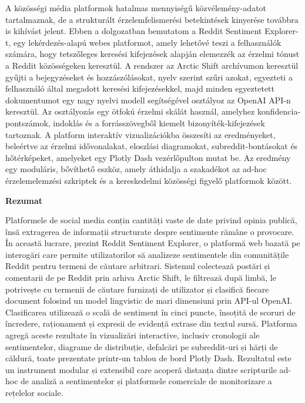 \begin{sloppypar}
A közösségi média platformok hatalmas mennyiségű közvélemény-adatot tartalmaznak, de a strukturált érzelemfelismerési betekintések kinyerése továbbra is kihívást jelent. Ebben a dolgozatban bemutatom a Reddit Sentiment Explorer-t, egy lekérdezés-alapú webes platformot, amely lehetővé teszi a felhasználók számára, hogy tetszőleges keresési kifejezések alapján elemezzék az érzelmi tónust a Reddit közösségeken keresztül. A rendszer az Arctic Shift archívumon keresztül gyűjti a bejegyzéseket és hozzászólásokat, nyelv szerint szűri azokat, egyezteti a felhasználó által megadott keresési kifejezésekkel, majd minden egyeztetett dokumentumot egy nagy nyelvi modell segítségével osztályoz az OpenAI API-n keresztül. Az osztályozás egy ötfokú érzelmi skálát használ, amelyhez konfidencia-pontszámok, indoklás és a forrásszövegből kiemelt bizonyíték-kifejezések tartoznak. A platform interaktív vizualizációkba összesíti az eredményeket, beleértve az érzelmi idővonalakat, eloszlási diagramokat, subreddit-bontásokat és hőtérképeket, amelyeket egy Plotly Dash vezérlőpulton mutat be. Az eredmény egy moduláris, bővíthető eszköz, amely áthidalja a szakadékot az ad-hoc érzelemelemzési szkriptek és a kereskedelmi közösségi figyelő platformok között.
\end{sloppypar}

\vspace{2em}

\begin{center}
  {\fontsize{14}{16} \textbf{Rezumat}}
\end{center}

Platformele de social media conțin cantități vaste de date privind opinia publică, însă extragerea de informații structurate despre sentimente rămâne o provocare. În această lucrare, prezint Reddit Sentiment Explorer, o platformă web bazată pe interogări care permite utilizatorilor să analizeze sentimentele din comunitățile Reddit pentru termeni de căutare arbitrari. Sistemul colectează postări și comentarii de pe Reddit prin arhiva Arctic Shift, le filtrează după limbă, le potrivește cu termenii de căutare furnizați de utilizator și clasifică fiecare document folosind un model lingvistic de mari dimensiuni prin API-ul OpenAI. Clasificarea utilizează o scală de sentiment în cinci puncte, însoțită de scoruri de încredere, raționament și expresii de evidență extrase din textul sursă. Platforma agregă aceste rezultate în vizualizări interactive, inclusiv cronologii ale sentimentelor, diagrame de distribuție, defalcări pe subreddit-uri și hărți de căldură, toate prezentate printr-un tablou de bord Plotly Dash. Rezultatul este un instrument modular și extensibil care acoperă distanța dintre scripturile ad-hoc de analiză a sentimentelor și platformele comerciale de monitorizare a rețelelor sociale.
